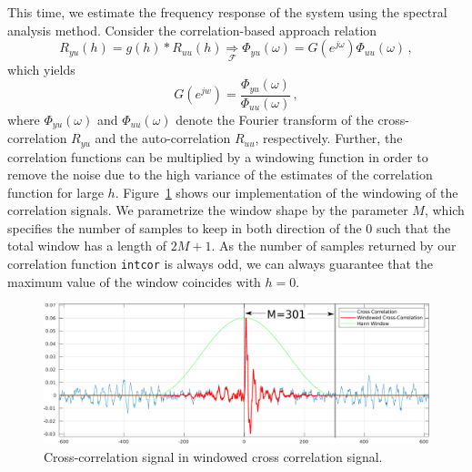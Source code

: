 \documentclass{scrartcl}
\begin{document}
This time, we estimate the frequency response of the system using the spectral analysis method.
Consider the correlation-based approach relation
\begin{equation}
	R_{yu}(h) = g(h) * R_{uu}(h) \underset{\mathcal{F}}{\Rightarrow} \Phi_{yu}(\omega) = G(e^{j \omega}) \Phi_{uu}(\omega)\, ,
\end{equation}
which yields
\begin{equation}
	G(e^{jw}) = \frac{\Phi_{yu}(\omega)}{\Phi_{uu}(\omega)}\, ,
\end{equation}
where $\Phi_{yu}(\omega)$ and $\Phi_{uu}(\omega)$ denote the Fourier transform of the cross-correlation $R_{yu}$ and the auto-correlation $R_{uu}$, respectively.
Further, the correlation functions can be multiplied by a windowing function in order to remove the noise due to the high variance of the estimates of the correlation function for large $h$.
Figure~\ref{fig:cross_corr_windowed} shows our implementation of the windowing of the correlation signals.
We parametrize the window shape by the parameter $M$, which specifies the number of samples to keep in both direction of the $0$ such that the total window has a length of $2M+1$. As the number of samples returned by our correlation function \texttt{intcor} is always odd, we can always guarantee that the maximum value of the window coincides with $h=0$.
\begin{figure}[h]
	\centering
	\includegraphics[width=\textwidth]{figures/windowed_cross_cor.pdf}
	\caption{Cross-correlation signal in windowed cross correlation signal.}
	\label{fig:cross_corr_windowed}
\end{figure}
\end{document}
